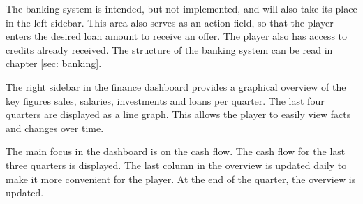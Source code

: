 The banking system is intended, but not implemented, and will also take its place in the left sidebar. This area also serves as an action field, so that the player enters the desired loan amount to receive an offer. The player also has access to credits already received. The structure of the banking system can be read in chapter \ref{sec: banking}. 

The right sidebar in the finance dashboard provides a graphical overview of the key figures sales, salaries, investments and loans per quarter. The last four quarters are displayed as a line graph. This allows the player to easily view facts and changes over time. 

The main focus in the dashboard is on the cash flow. The cash flow for the last three quarters is displayed. The last column in the overview is updated daily to make it more convenient for the player. At the end of the quarter, the overview is updated. 
